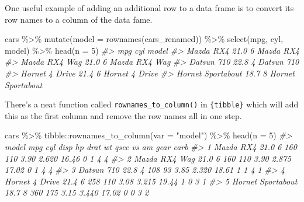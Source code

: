 \documentclass[
  12pt,
]{book}
\newenvironment{Shaded}{\begin{snugshade}}{\end{snugshade}}
\newcommand{\AttributeTok}[1]{\textcolor[rgb]{0.77,0.63,0.00}{#1}}
\newcommand{\CommentTok}[1]{\textcolor[rgb]{0.56,0.35,0.01}{\textit{#1}}}
\newcommand{\DecValTok}[1]{\textcolor[rgb]{0.00,0.00,0.81}{#1}}
\newcommand{\FunctionTok}[1]{\textcolor[rgb]{0.00,0.00,0.00}{#1}}
\newcommand{\NormalTok}[1]{#1}
\newcommand{\SpecialCharTok}[1]{\textcolor[rgb]{0.00,0.00,0.00}{#1}}
\newcommand{\StringTok}[1]{\textcolor[rgb]{0.31,0.60,0.02}{#1}}
\begin{document}
One useful example of adding an additional row to a data frame is to convert its row names to a column of the data fame.

\begin{Shaded}
\begin{Highlighting}[]
\NormalTok{cars }\SpecialCharTok{\%\textgreater{}\%} 
  \FunctionTok{mutate}\NormalTok{(}\AttributeTok{model =} \FunctionTok{rownames}\NormalTok{(cars\_renamed)) }\SpecialCharTok{\%\textgreater{}\%} 
  \FunctionTok{select}\NormalTok{(mpg, cyl, model) }\SpecialCharTok{\%\textgreater{}\%} 
  \FunctionTok{head}\NormalTok{(}\AttributeTok{n =} \DecValTok{5}\NormalTok{)}
\CommentTok{\#\textgreater{}                    mpg cyl             model}
\CommentTok{\#\textgreater{} Mazda RX4         21.0   6         Mazda RX4}
\CommentTok{\#\textgreater{} Mazda RX4 Wag     21.0   6     Mazda RX4 Wag}
\CommentTok{\#\textgreater{} Datsun 710        22.8   4        Datsun 710}
\CommentTok{\#\textgreater{} Hornet 4 Drive    21.4   6    Hornet 4 Drive}
\CommentTok{\#\textgreater{} Hornet Sportabout 18.7   8 Hornet Sportabout}
\end{Highlighting}
\end{Shaded}

There's a neat function called \texttt{rownames\_to\_column()} in \texttt{\{tibble\}} which will add this as the first column and remove the row names all in one step.

\begin{Shaded}
\begin{Highlighting}[]
\NormalTok{cars }\SpecialCharTok{\%\textgreater{}\%} 
\NormalTok{  tibble}\SpecialCharTok{::}\FunctionTok{rownames\_to\_column}\NormalTok{(}\AttributeTok{var =} \StringTok{"model"}\NormalTok{) }\SpecialCharTok{\%\textgreater{}\%} 
  \FunctionTok{head}\NormalTok{(}\AttributeTok{n =} \DecValTok{5}\NormalTok{)}
\CommentTok{\#\textgreater{}               model  mpg cyl disp  hp drat    wt  qsec vs am gear carb}
\CommentTok{\#\textgreater{} 1         Mazda RX4 21.0   6  160 110 3.90 2.620 16.46  0  1    4    4}
\CommentTok{\#\textgreater{} 2     Mazda RX4 Wag 21.0   6  160 110 3.90 2.875 17.02  0  1    4    4}
\CommentTok{\#\textgreater{} 3        Datsun 710 22.8   4  108  93 3.85 2.320 18.61  1  1    4    1}
\CommentTok{\#\textgreater{} 4    Hornet 4 Drive 21.4   6  258 110 3.08 3.215 19.44  1  0    3    1}
\CommentTok{\#\textgreater{} 5 Hornet Sportabout 18.7   8  360 175 3.15 3.440 17.02  0  0    3    2}
\end{Highlighting}
\end{Shaded}
\end{document}
